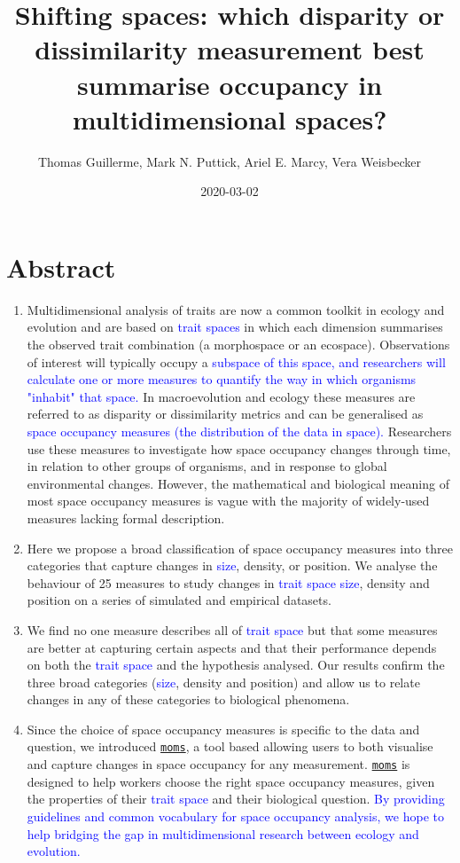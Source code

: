 \documentclass[]{article}
\title{Shifting spaces: which disparity or dissimilarity measurement best
summarise occupancy in multidimensional spaces?}
\author{Thomas Guillerme, Mark N. Puttick, Ariel E. Marcy, Vera Weisbecker}
\date{2020-03-02}
\begin{document}
\maketitle
\modulolinenumbers[1] %
\linenumbers
\section{Abstract}\label{abstract}

\begin{enumerate}
\def\labelenumi{\arabic{enumi}.}
\item
  Multidimensional analysis of traits are now a common toolkit in
  ecology and evolution and are based on
  \textcolor{blue}{trait spaces} in which each dimension
  summarises the observed trait combination (a morphospace or an
  ecospace). Observations of interest will typically occupy a
  \textcolor{blue}{subspace of this space, and researchers will calculate one or more measures to quantify the way in which organisms "inhabit" that space.}
  In macroevolution and ecology these measures are referred to as
  disparity or dissimilarity metrics and can be generalised as
  \textcolor{blue}{space occupancy measures (the distribution of the data in space).}
  Researchers use these measures to investigate how space occupancy
  changes through time, in relation to other groups of organisms, and in
  response to global environmental changes. However, the mathematical
  and biological meaning of most space occupancy measures is vague with
  the majority of widely-used measures lacking formal description.
\item
  Here we propose a broad classification of space occupancy measures
  into three categories that capture changes in
  \textcolor{blue}{size}, density, or position. We analyse
  the behaviour of 25 measures to study changes in
  \textcolor{blue}{trait space size}, density and position
  on a series of simulated and empirical datasets.
\item
  We find no one measure describes all of
  \textcolor{blue}{trait space} but that some measures are
  better at capturing certain aspects and that their performance depends
  on both the \textcolor{blue}{trait space} and the
  hypothesis analysed. Our results confirm the three broad categories
  (\textcolor{blue}{size}, density and position) and allow
  us to relate changes in any of these categories to biological
  phenomena.
\item
  Since the choice of space occupancy measures is specific to the data
  and question, we introduced
  \href{https://tguillerme.shinyapps.io/moms/}{\texttt{moms}}, a tool
  based allowing users to both visualise and capture changes in space
  occupancy for any measurement.
  \href{https://tguillerme.shinyapps.io/moms/}{\texttt{moms}} is
  designed to help workers choose the right space occupancy measures,
  given the properties of their
  \textcolor{blue}{trait space} and their biological
  question.
  \textcolor{blue}{By providing guidelines and common vocabulary for space occupancy analysis, we hope to help bridging the gap in multidimensional research between ecology and evolution.}
\end{enumerate}
\end{document}
